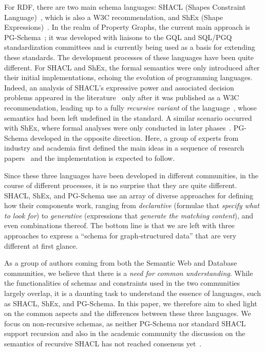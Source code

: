 For RDF, there are two main schema languages: SHACL (Shapes Constraint
Language)~\cite{KK17}, which is also a W3C recommendation, and ShEx (Shape
Expressions)~\cite{PGS14}.
In the realm of Property Graphs, the current main approach is
PG-Schema~\cite{ABDF23,ABDF21}; it was developed with liaisons to the GQL and SQL/PGQ standardization committees and is currently being used as a basis for extending these standards.
The development processes of these languages have been quite different.
For SHACL and ShEx, the formal semantics were only introduced after their
initial implementations, echoing the evolution of programming languages.
Indeed, an analysis of SHACL's expressive power and associated decision problems
appeared in the literature~\cite{LSRLS20,PKMN20,PK21,BJB22,PKM22,BJVdB24} only
after it was published as a W3C recommendation, leading up to a fully
\emph{recursive variant} of the
language~\cite{CRS18,CFRS19,ACORSS20,BJ21,PKM22}, whose semantics had been left
undefined in the standard.
%
A similar scenario occurred with ShEx, where formal analyses were only conducted
in later phases~\cite{BGP17,SBG15}.
%
PG-Schema developed in the opposite direction.
Here, a group of experts from industry and academia first defined the main ideas
in a sequence of research papers~\cite{ABDF21,ABDF23} and the implementation is
expected to follow.

Since these three languages have been developed in different communities, in the
course of different processes, it is no surprise that they are quite different.
SHACL, ShEx, and PG-Schema use an array of diverse approaches for defining how
their components work, ranging from \emph{declarative} (formulae that
\emph{specify what to look for}) to \emph{generative} (expressions that
\emph{generate the matching content}), and even combinations thereof.
The bottom line is that we are left with three approaches to express a ``schema
for graph-structured data'' that are very different at first glance.

As a group of authors coming from both the Semantic Web and Database
communities, we believe that there is a \emph{need for common understanding}.
While the functionalities of schemas and constraints used in the two communities
largely overlap, it is a daunting task to understand the essence of languages,
such as SHACL, ShEx, and PG-Schema.
In this paper, we therefore aim to shed light on the common aspects and the
differences between these three languages.
We focus on non-recursive schemas, as neither PG-Schema nor
standard SHACL support recursion and also in the academic community the
discussion on the semantics of recursive SHACL has not reached consensus
yet~\cite{CRS18,CFRS19,ACORSS20,BJ21,PKM22,OS24}.

